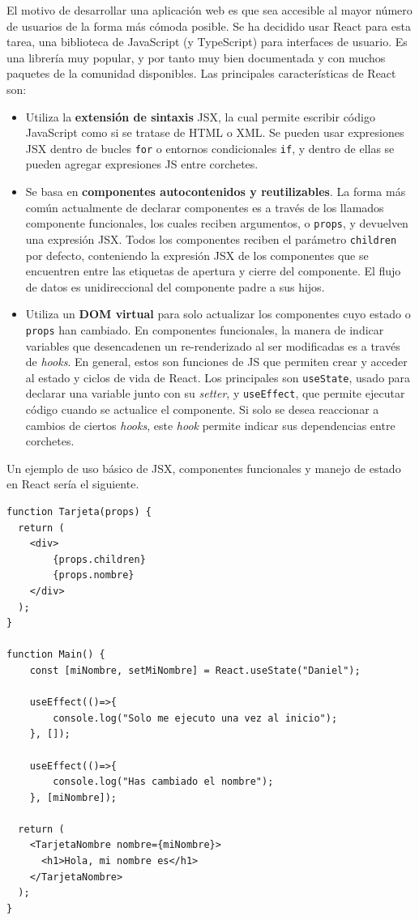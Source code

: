 El motivo de desarrollar una aplicación web es que sea accesible al mayor número de usuarios de la forma más cómoda posible. Se ha decidido usar React \cite{react} para esta tarea, una biblioteca de JavaScript (y TypeScript) para interfaces de usuario. Es una librería muy popular, y por tanto muy bien documentada y con muchos paquetes de la comunidad disponibles. Las principales características de React son:
\begin{itemize}
    \item Utiliza la \textbf{extensión de sintaxis} JSX, la cual permite escribir código JavaScript como si se tratase de HTML o XML. Se pueden usar expresiones JSX dentro de bucles \texttt{for} o entornos condicionales \texttt{if}, y dentro de ellas se pueden agregar expresiones JS entre corchetes. 
    \item Se basa en \textbf{componentes autocontenidos y reutilizables}. La forma más común actualmente de declarar componentes es a través de los llamados componente funcionales, los cuales reciben argumentos, o \texttt{props}, y devuelven una expresión JSX. Todos los componentes reciben el parámetro \texttt{children} por defecto, conteniendo la expresión JSX de los componentes que se encuentren entre las etiquetas de apertura y cierre del componente. El flujo de datos es unidireccional del componente padre a sus hijos.
    \item Utiliza un \textbf{DOM virtual} para solo actualizar los componentes cuyo estado o \texttt{props} han cambiado. En componentes funcionales, la manera de indicar variables que desencadenen un re-renderizado al ser modificadas es a través de \textit{hooks}. En general, estos son funciones de JS que permiten crear y acceder al estado y ciclos de vida de React. Los principales son \texttt{useState}, usado para declarar una variable junto con su \textit{setter}, y \texttt{useEffect}, que permite ejecutar código cuando se actualice el componente. Si solo se desea reaccionar a cambios de ciertos \textit{hooks}, este \textit{hook} permite indicar sus dependencias entre corchetes.
\end{itemize}
Un ejemplo de uso básico de JSX, componentes funcionales y manejo de estado en React sería el siguiente.
\begin{lstlisting}
function Tarjeta(props) {
  return (
    <div>
        {props.children}
        {props.nombre}
    </div>
  );
}

function Main() {
    const [miNombre, setMiNombre] = React.useState("Daniel");

    useEffect(()=>{
        console.log("Solo me ejecuto una vez al inicio");
    }, []);
    
    useEffect(()=>{
        console.log("Has cambiado el nombre");
    }, [miNombre]);
    
  return (
    <TarjetaNombre nombre={miNombre}>
      <h1>Hola, mi nombre es</h1>
    </TarjetaNombre>
  );
}
\end{lstlisting}

